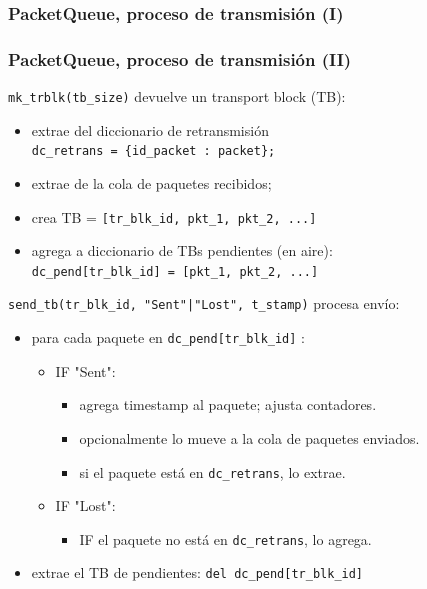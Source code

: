\documentclass[spanish]{beamer}    %
\begin{document}

\begin{frame}[plain]
    \frametitle{PacketQueue, proceso de transmisión (I)}
    \center {}
\end{frame}


\begin{frame}
    \frametitle{PacketQueue, proceso de transmisión (II)}
\texttt{mk\_trblk(tb\_size)} devuelve un transport block (TB):
\begin{itemize}
    \item extrae del diccionario de retransmisión\\ \texttt{dc\_retrans = \{id\_packet : packet\};}
    \item extrae de la cola de paquetes recibidos;
    \item crea TB = \texttt{[tr\_blk\_id, pkt\_1, pkt\_2, ...] }
    \item agrega a diccionario de TBs pendientes (en aire):\\ \texttt{dc\_pend[tr\_blk\_id] = [pkt\_1, pkt\_2, ...] }
\end{itemize}
\vspace{0.2cm}
\texttt{send\_tb(tr\_blk\_id, "Sent"|"Lost", t\_stamp)} procesa envío:
\begin{itemize}
    \item para cada paquete en \texttt{dc\_pend[tr\_blk\_id]} :
    \begin{itemize}
        \item IF "Sent":
        \begin{itemize}
            \item agrega timestamp al paquete; ajusta contadores. 
            \item opcionalmente lo mueve a la cola de paquetes enviados.
            \item si el paquete está en \texttt{dc\_retrans}, lo extrae.
        \end{itemize}
        \item IF "Lost":
            \begin{itemize}
                \item IF el paquete no está en \texttt{dc\_retrans}, lo agrega.
            \end{itemize}
    \end{itemize}
    \item extrae el TB de pendientes: \texttt{del dc\_pend[tr\_blk\_id] }
\end{itemize}

\end{frame}
\end{document}
